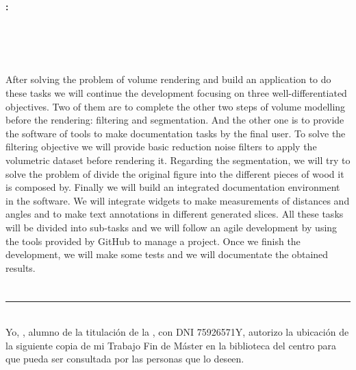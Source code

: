 \thispagestyle{empty}

\cleardoublepage

\begin{center}
	{\large\bfseries \myTitle: \myEnglishSubtitle}\\
\end{center}

\begin{center}
	\myName \\
\end{center}

\vspace{0.7cm}
\\

\vspace{0.7cm}
\\

After solving the problem of volume rendering and build an application to do these tasks we will continue the development focusing on three well-differentiated objectives. Two of them are to complete the other two steps of volume modelling before the rendering: filtering and segmentation. And the other one is to provide the software of tools to make documentation tasks by the final user. To solve the filtering objective we will provide basic reduction noise filters to apply the volumetric dataset before rendering it. Regarding the segmentation, we will try to solve the problem of divide the original figure into the different pieces of wood it is composed by. Finally we will build an integrated documentation environment in the software. We will integrate widgets to make measurements of distances and angles and to make text annotations in different generated slices. All these tasks will be divided into sub-tasks and we will follow an agile development by using the tools provided by GitHub to manage a project. Once we finish the development, we will make some tests and we will documentate the obtained results.

\chapter*{}
\thispagestyle{empty}

\noindent\rule[-1ex]{\textwidth}{2pt}\\[4.5ex]

Yo, \textbf{\myName}, alumno de la titulación \myDegree de la \textbf{\myFaculty}, con DNI 75926571Y, autorizo la ubicación de la siguiente copia de mi Trabajo Fin de Máster en la biblioteca del centro para que pueda ser consultada por las personas que lo deseen.

